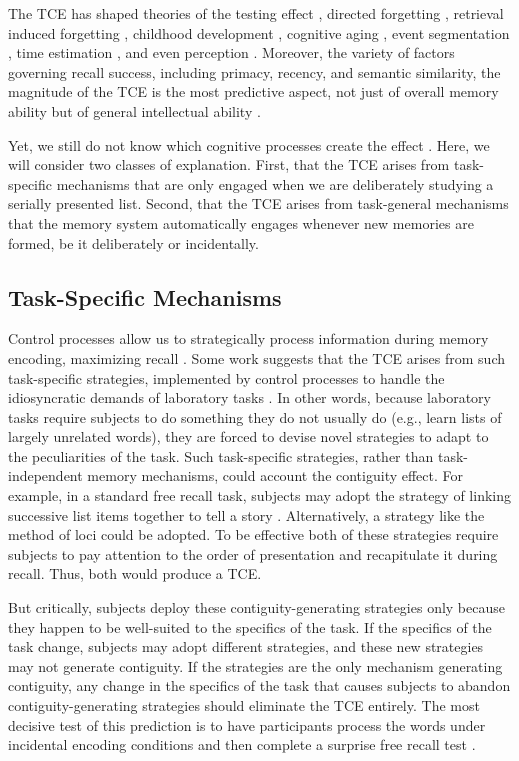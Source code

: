 \documentclass[man,natbib,floatsintext]{apa6} %
\begin{document}
The TCE has shaped theories of the testing effect \citep{KarpEtal14}, directed forgetting \citep{SahaEtal13}, retrieval induced forgetting \citep{KlieBaum16}, childhood development \citep{JarroEtal15}, cognitive aging \citep{WahlHuff15,HealKaha15}, event segmentation \citep{EzzyDava14}, time estimation \citep{SahaSmit13}, and even perception \citep{TurkEtal12}. Moreover, the variety of factors governing recall success, including primacy, recency, and semantic similarity, the magnitude of the TCE is the most predictive aspect, not just of overall memory ability \citep{SedeEtal10,SpilUnsw11} but of general intellectual ability \citep{HealEtal14}. 

Yet, we still do not know which cognitive processes create the effect \citep{HealKaha17}. Here, we will consider two classes of explanation. First, that the TCE arises from task-specific mechanisms that are only engaged when we are deliberately studying a serially presented list. Second, that the TCE arises from task-general mechanisms that the memory system automatically engages whenever new memories are formed, be it deliberately or incidentally. 



\label{TODO-2}   
\subsection{Task-Specific Mechanisms}
Control processes \citep{LehmMalm13,AtkiShif68} allow us to strategically process information during memory encoding, maximizing recall \citep[e.g.,][]{Unsw16,DelaKnow05}. Some work suggests that the TCE arises from such task-specific strategies, implemented by control processes to handle the idiosyncratic demands of laboratory tasks \citep{Hint16}. In other words, because laboratory tasks require subjects to do something they do not usually do (e.g., learn lists of largely unrelated words), they are forced to devise novel strategies to adapt to the peculiarities of the task. Such task-specific strategies, rather than task-independent memory mechanisms, could account the contiguity effect. For example, in a standard free recall task, subjects may adopt the strategy of linking successive list items together to tell a story \citep{DelaKnow05}. Alternatively, a strategy like the method of loci could be adopted. 
To be effective both of these strategies require subjects to pay attention to the order of presentation and recapitulate it during recall. Thus, both would produce a TCE. 

But critically, subjects deploy these contiguity-generating strategies only because they happen to be well-suited to the specifics of the task. If the specifics of the task change, subjects may adopt different strategies, and these new strategies may not generate contiguity.
If the strategies are the only mechanism generating contiguity, any change in the specifics of the task that causes subjects to abandon contiguity-generating strategies should eliminate the TCE entirely. The most decisive test of this prediction is to have participants process the words under incidental encoding conditions and then complete a surprise free recall test \citep{Hint16}.
\end{document}
